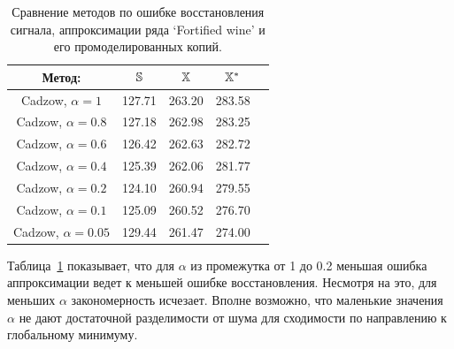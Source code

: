 \documentclass[12pt, specialist, subf,href,colorlinks=true,substylefile = spbu.rtx]{disser}
\theoremstyle{remark}
\theoremstyle{definition}
\begin{document}
%
%

\begin{table}[!hhh]
	\begin{center}
	\caption{Сравнение методов по ошибке восстановления сигнала, аппроксимации ряда `Fortified wine' и его промоделированных копий.}
	\label{tab:rltable}
	
    \begin{tabular}{|c|c|c|c|c|}
		\hline
		Метод: & $\mathbb{S}$ & $\mathbb{X}$ & $\mathbb{X}^*$ \\
		\hline
		Cadzow, $\alpha = 1$ & 127.71 & 263.20 & 283.58 \\
		\hline
		Cadzow, $\alpha = 0.8$ & 127.18 & 262.98 & 283.25 \\
		\hline
		Cadzow, $\alpha = 0.6$ & 126.42 & 262.63 & 282.72 \\
		\hline
		Cadzow, $\alpha = 0.4$ & 125.39 & 262.06 & 281.77 \\
		\hline
		Cadzow, $\alpha = 0.2$ & 124.10 & 260.94 & 279.55 \\
		\hline
		Cadzow, $\alpha = 0.1$ & 125.09 & 260.52 & 276.70 \\
		\hline
		Cadzow, $\alpha = 0.05$ & 129.44 & 261.47 & 274.00 \\
		\hline
	\end{tabular}
	\end{center}
\end{table}

Таблица~\ref{tab:rltable} показывает, что для $\alpha$ из промежутка от 1 до 0.2
меньшая ошибка аппроксимации ведет к меньшей ошибке восстановления. Несмотря на это, для меньших $\alpha$ закономерность исчезает. Вполне возможно, что маленькие значения $\alpha$ не дают достаточной разделимости от шума для сходимости по направлению к глобальному минимуму. 

\end{document}
